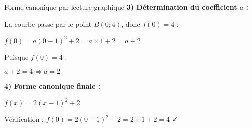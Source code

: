 \begin{EXO}{Forme canonique par lecture graphique}{}
\textbf{3) Détermination du coefficient $a$ :}

La courbe passe par le point $B(0;4)$, donc $f(0) = 4$ :

$f(0) = a(0-1)^2 + 2 = a \times 1 + 2 = a + 2$

Puisque $f(0) = 4$ :
\begin{center}$a + 2 = 4 \Leftrightarrow a = 2$\end{center}

\textbf{4) Forme canonique finale :}

\begin{center}$f(x) = 2(x-1)^2 + 2$\end{center}

Vérification : $f(0) = 2(0-1)^2 + 2 = 2 \times 1 + 2 = 4$ ✓
\end{EXO}